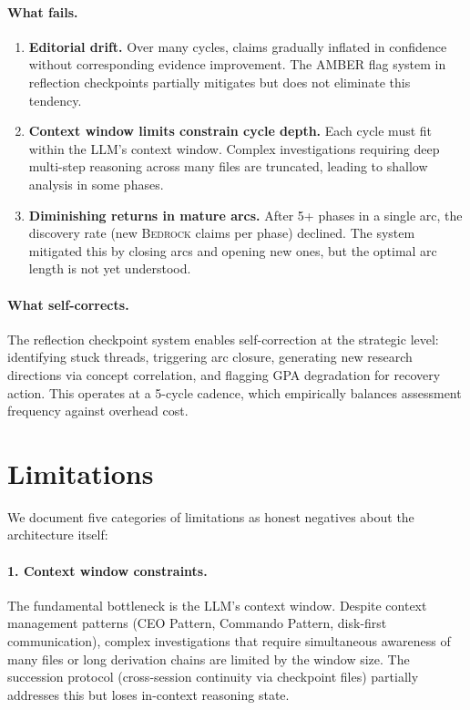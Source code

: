 \documentclass[11pt,a4paper]{article}
\newcommand{\bedrock}{\textsc{Bedrock}}
\begin{document}
\paragraph{What fails.}
\begin{enumerate}[nosep]
    \item \textbf{Editorial drift.} Over many cycles, claims gradually inflated
          in confidence without corresponding evidence improvement. The AMBER flag
          system in reflection checkpoints partially mitigates but does not eliminate
          this tendency.
    \item \textbf{Context window limits constrain cycle depth.} Each cycle must
          fit within the LLM's context window. Complex investigations requiring
          deep multi-step reasoning across many files are truncated, leading to
          shallow analysis in some phases.
    \item \textbf{Diminishing returns in mature arcs.} After 5+ phases in a single
          arc, the discovery rate (new \bedrock{} claims per phase) declined.
          The system mitigated this by closing arcs and opening new ones, but
          the optimal arc length is not yet understood.
\end{enumerate}

\paragraph{What self-corrects.}
The reflection checkpoint system enables self-correction at the strategic level:
identifying stuck threads, triggering arc closure, generating new research
directions via concept correlation, and flagging GPA degradation for recovery
action. This operates at a 5-cycle cadence, which empirically balances assessment
frequency against overhead cost.

\section{Limitations}
\label{sec:limitations}

We document five categories of limitations as honest negatives about the architecture
itself:

\paragraph{1. Context window constraints.}
The fundamental bottleneck is the LLM's context window. Despite context management
patterns (CEO Pattern, Commando Pattern, disk-first communication), complex
investigations that require simultaneous awareness of many files or long derivation
chains are limited by the window size. The succession protocol (cross-session
continuity via checkpoint files) partially addresses this but loses in-context
reasoning state.
\end{document}
